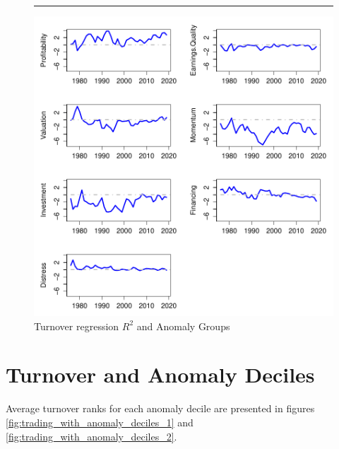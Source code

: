 \documentclass[
  11pt,
  a4paper,
  twoside,
  onecolumn]{article}
\begin{document}
\begin{figure}
\caption{Turnover regression $R^2$ and Anomaly Groups}
\label{fig:dropping_one_anomaly_group}
\rule[0.25ex]{\linewidth}{1pt}
\begin{center}
\includegraphics{dropping_one_anomaly_group.pdf}
\end{center}
\end{figure}

\hypertarget{turnover-and-anomaly-deciles}{%
\section{Turnover and Anomaly
Deciles}\label{turnover-and-anomaly-deciles}}

Average turnover ranks for each anomaly decile are presented in figures
\ref{fig:trading_with_anomaly_deciles_1} and
\ref{fig:trading_with_anomaly_deciles_2}.
\end{document}
